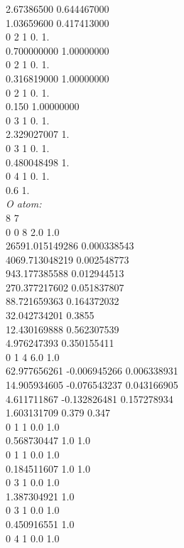 \documentclass[11pt,DIV=13,BCOR=5mm,a4paper,headinclude]{scrbook}
\begin{document}
\begin{spacing}{0.5}
{       2.67386500         0.644467000\\
       1.03659600         0.417413000\\
0 2 1 0. 1.\\
      0.700000000          1.00000000\\
0 2 1 0. 1.\\
      0.316819000          1.00000000\\
0 2 1 0. 1.\\
      0.150          1.00000000\\
0  3  1  0.  1.\\
       2.329027007      1.\\
0  3  1  0.  1.\\
       0.480048498      1.\\
0  4  1  0.  1.\\
       0.6      1.\\
\textit{O atom:}\\
8 7\\
0 0 8 2.0 1.0\\
 26591.015149286   0.000338543\\
 4069.713048219    0.002548773\\
 943.177385588     0.012944513\\
 270.377217602     0.051837807\\
 88.721659363      0.164372032\\
 32.042734201      0.3855\\
 12.430169888      0.562307539\\
 4.976247393       0.350155411\\
0 1 4 6.0 1.0\\
 62.977656261     -0.006945266     0.006338931\\
 14.905934605     -0.076543237     0.043166905\\
 4.611711867      -0.132826481     0.157278934\\
 1.603131709       0.379           0.347\\
0 1 1 0.0 1.0\\
 0.568730447       1.0             1.0\\
0 1 1 0.0 1.0\\
 0.184511607       1.0             1.0\\
0 3 1 0.0 1.0\\
 1.387304921       1.0\\
0 3 1 0.0 1.0\\
 0.450916551       1.0\\
0 4 1 0.0 1.0\\
}
\end{spacing}
\end{document}
